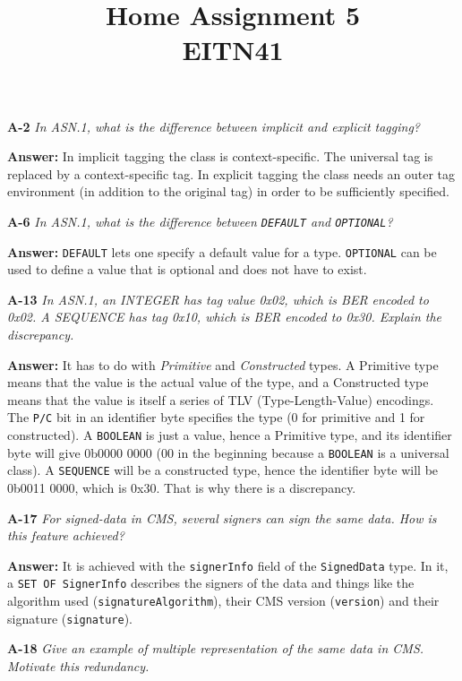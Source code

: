 \documentclass[a4paper]{article}
\title{Home Assignment 5 \\ EITN41}
\author{}
\date{}
\newcommand{\Q}[2]{ \vspace{10pt} \textbf{A-#1} \textit{#2} }
\newcommand{\A}[1]{ \textbf{Answer:} #1 }
\begin{document}
\maketitle

\Q{2} {
    In ASN.1, what is the difference between implicit and explicit tagging?
}

\A{
    In implicit tagging the class is context-specific.
    The universal tag is replaced by a context-specific tag.
    In explicit tagging the class needs an outer tag environment 
    (in addition to the original tag) in order to be
    sufficiently specified.
}

\Q{6} {
    In ASN.1, what is the difference between \texttt{DEFAULT} and 
    \texttt{OPTIONAL}?
}

\A{
    \texttt{DEFAULT} lets one specify a default value for a type.
    \texttt{OPTIONAL} can be used to define a value that is optional
    and does not have to exist.
}

\Q{13} { %
    In ASN.1, an INTEGER has tag value 0x02, which is BER encoded to 0x02.
    A SEQUENCE has tag 0x10, which is BER encoded to 0x30.
    Explain the discrepancy.
}

\A{
    It has to do with \textit{Primitive} and \textit{Constructed}
    types. A Primitive type means that the value is the actual value 
    of the type, and a Constructed type means that the value is
    itself a series of TLV (Type-Length-Value) encodings.
    The \texttt{P/C} bit in an identifier byte specifies the type 
    (0 for primitive and 1 for constructed).
    A \texttt{BOOLEAN} is just a value, hence a Primitive type,
    and its identifier byte will give 0b0000 0000 (00 in the 
    beginning because a \texttt{BOOLEAN} is a universal class).
    A \texttt{SEQUENCE} will be a constructed type, hence the
    identifier byte will be 0b0011 0000, which is 0x30.
    That is why there is a discrepancy.
}

\Q{17} {
    For signed-data in CMS, several signers can sign the same data. 
    How is this feature achieved?
}

\A{
    It is achieved with the \texttt{signerInfo} field of the 
    \texttt{SignedData} type. In it, a \texttt{SET OF SignerInfo}
    describes the signers of the data and things like the algorithm
    used (\texttt{signatureAlgorithm}), their CMS version (\texttt{version})
    and their signature (\texttt{signature}). 
}

\Q{18} {
    Give an example of multiple representation of the same data in CMS.
    Motivate this redundancy.
}
\end{document}
